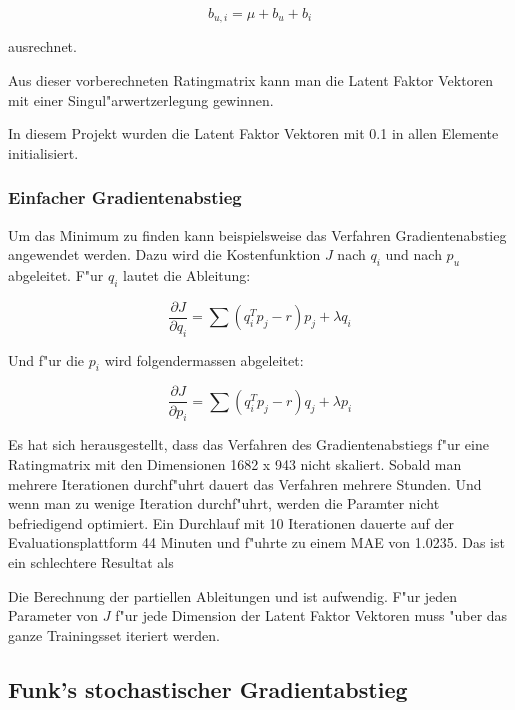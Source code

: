 \documentclass[a4paper, 12pt]{article}
\begin{document}
\begin{equation}
  \label{eq:mu2}
    b_{u,i} = \mu + b_u + b_i
\end{equation}

ausrechnet.

Aus dieser vorberechneten Ratingmatrix kann man die Latent Faktor Vektoren mit einer Singul"arwertzerlegung gewinnen.

In diesem Projekt wurden die Latent Faktor Vektoren mit 0.1 in allen Elemente initialisiert.

\subsubsection{Einfacher Gradientenabstieg}
\label{sec:gradientdescent}
 
Um das Minimum zu finden kann beispielsweise das Verfahren Gradientenabstieg angewendet werden. Dazu wird die Kostenfunktion $J$ nach $q_i$ und nach $p_u$ abgeleitet. F"ur $q_i$ lautet die Ableitung:

\begin{equation}
  \label{eq:decx}
  \frac{ \partial J }{ \partial q_i } = \sum (q_i^T p_j - r) p_j + \lambda q_i
\end{equation}

Und f"ur die $p_i$ wird folgendermassen abgeleitet:

\begin{equation}
  \label{eq:dectheta}
  \frac{ \partial J }{ \partial p_i } = \sum (q_i^T p_j - r) q_j + \lambda p_i
\end{equation}

Es hat sich herausgestellt, dass das Verfahren des Gradientenabstiegs f"ur eine Ratingmatrix mit den Dimensionen 1682 x 943 nicht skaliert. Sobald man mehrere Iterationen durchf"uhrt dauert das Verfahren mehrere Stunden. Und wenn man zu wenige Iteration durchf"uhrt, werden die Paramter nicht befriedigend optimiert. Ein Durchlauf mit 10 Iterationen dauerte auf der Evaluationsplattform 44 Minuten und f"uhrte zu einem MAE von 1.0235. Das ist ein schlechtere Resultat als 

Die Berechnung der partiellen Ableitungen \label{eq:decx} und \label{eq:dectheta} ist aufwendig. F"ur jeden Parameter von $J$ f"ur jede Dimension der Latent Faktor Vektoren muss "uber das ganze Trainingsset iteriert werden.

\subsection{Funk's stochastischer Gradientabstieg}
\label{sec:funksvd}
\end{document}
